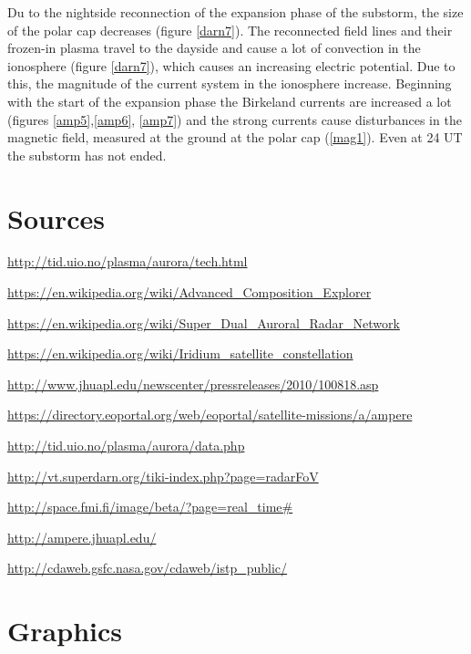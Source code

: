 \documentclass[10pt,a4paper]{article}
\begin{document}
Du to the nightside reconnection of the expansion phase of the substorm, the size of the polar cap decreases (figure \ref{darn7}). The reconnected field lines and their frozen-in plasma travel to the dayside and cause a lot of convection in the ionosphere (figure \ref{darn7}), which causes an increasing electric potential. Due to this, the magnitude of the current system in the ionosphere increase. Beginning with the start of the expansion phase the Birkeland currents are increased a lot (figures \ref*{amp5},\ref*{amp6}, \ref*{amp7}) and the strong currents cause disturbances in the magnetic field, measured at the ground at the polar cap (\ref{mag1}). Even at 24 UT the substorm has not ended.


\section{Sources}


	\url{http://tid.uio.no/plasma/aurora/tech.html}
	
	\url{https://en.wikipedia.org/wiki/Advanced_Composition_Explorer}
	
	\url{https://en.wikipedia.org/wiki/Super_Dual_Auroral_Radar_Network}
	
	\url{https://en.wikipedia.org/wiki/Iridium_satellite_constellation}
	
	\url{http://www.jhuapl.edu/newscenter/pressreleases/2010/100818.asp}
	
	\url{https://directory.eoportal.org/web/eoportal/satellite-missions/a/ampere}

	\url{http://tid.uio.no/plasma/aurora/data.php}
	
	\url{http://vt.superdarn.org/tiki-index.php?page=radarFoV}
	
	\url{http://space.fmi.fi/image/beta/?page=real_time#}
	
	\url{http://ampere.jhuapl.edu/}
	
	\url{http://cdaweb.gsfc.nasa.gov/cdaweb/istp_public/}
	
\section{Graphics}
\end{document}
